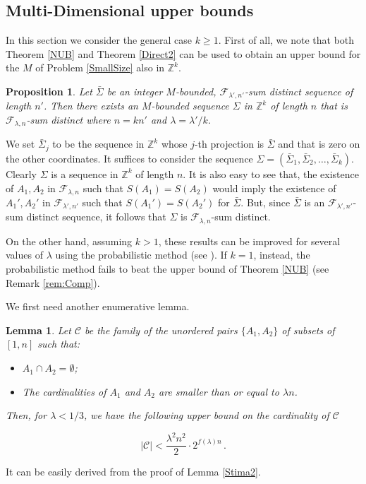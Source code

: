 \documentclass[a4paper]{amsart}
\theoremstyle{plain}
\newtheorem{Proposition}[Definition]{Proposition}
\newtheorem{Lemma}[Definition]{Lemma}
\begin{document}
\subsection{Multi-Dimensional upper bounds}
In this section we consider the general case $k\geq 1$. First of all, we note that both Theorem \ref{NUB} and Theorem \ref{Direct2} can be used to obtain an upper bound for the $M$ of Problem \ref{SmallSize} also in $\mathbb{Z}^k$.
\begin{Proposition}\label{Recursive}
Let $\bar{\Sigma}$ be an integer $M$-bounded, $\mathcal{F}_{\lambda',n'}$-sum distinct sequence of length $n'$. Then there exists an $M$-bounded sequence $\Sigma$ in $\mathbb{Z}^k$ of length $n$ that is $\mathcal{F}_{\lambda,n}$-sum distinct where $n=kn'$ and $\lambda=\lambda'/k$.
\end{Proposition}

\proof
We set $\bar{\Sigma}_{j}$ to be the sequence in $\mathbb{Z}^k$ whose $j$-th projection is $\bar{\Sigma}$ and that is zero on the other coordinates.
It suffices to consider the sequence $\Sigma=(\bar{\Sigma}_1,\bar{\Sigma}_2,\dots,\bar{\Sigma}_{k})$. Clearly $\Sigma$ is a sequence in $\mathbb{Z}^k$ of length $n$. It is also easy to see that, the existence of $A_1, A_2$ in $\mathcal{F}_{\lambda,n}$ such that $S(A_1)=S(A_2)$ would imply the existence of $A_1', A_2'$ in $\mathcal{F}_{\lambda',n'}$ such that $S(A_1')=S(A_2')$ for $\bar{\Sigma}$. But, since $\bar{\Sigma}$ is an $\mathcal{F}_{\lambda',n'}$-sum distinct sequence, it follows that $\Sigma$ is $\mathcal{F}_{\lambda,n}$-sum distinct.
\endproof

On the other hand, assuming $k>1$, these results can be improved for several values of $\lambda$ using the probabilistic method (see \cite{Alon2}). If $k=1$, instead, the probabilistic method fails to beat the upper bound of Theorem \ref{NUB} (see Remark \ref{rem:Comp}).

We first need another enumerative lemma.
\begin{Lemma}\label{Stima3}
Let $\mathcal{C}$ be the family of the unordered pairs $\{A_1,A_2\}$ of subsets of $[1,n]$ such that:
\begin{itemize}
\item $A_1\cap A_2=\emptyset$;
\item The cardinalities of $A_1$ and $A_2$ are smaller than or equal to $\lambda n$.
\end{itemize}
Then, for $\lambda<1/3$, we have the following upper bound on the cardinality of $\mathcal{C}$

\begin{equation*}\label{eq:multibound2}
|\mathcal{C}|< \frac{\lambda^2 n^2}{2} \cdot 2^{ f(\lambda) n}\,.
\end{equation*}
\end{Lemma}
\proof
It can be easily derived from the proof of Lemma \ref{Stima2}.
\endproof
\end{document}
